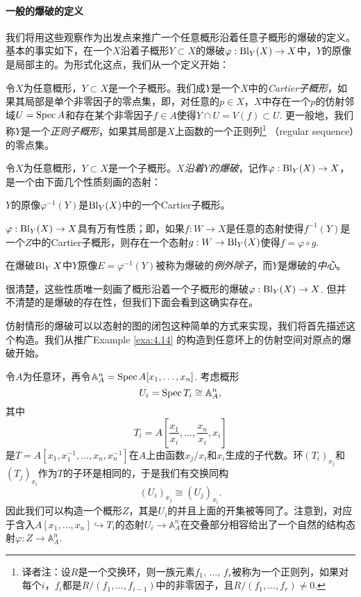 \paragraph*{一般的爆破的定义}
我们将用这些观察作为出发点来推广一个任意概形沿着任意子概形的爆破的定义。基本的事实如下，在一个$X$沿着子概形$Y\subset X$的爆破$\varphi:\operatorname{Bl}_Y(X)\to X$中，$Y$的原像是局部主的。为形式化这点，我们从一个定义开始：


\begin{defi}\label{defi:4.15}
	令$X$为任意概形，$Y\subset X$是一个子概形。我们成$Y$是一个$X$中的\textit{Cartier子概形}，如果其局部是单个非零因子的零点集，即，对任意的$p\in X$，$X$中存在一个$p$的仿射邻域$U=\operatorname{Spec} A$和存在某个非零因子$f\in A$使得$Y\cap U=V(f)\subset U$. 更一般地，我们称$Y$是一个\textit{正则子概形}，如果其局部是$X$上函数的一个正则列\footnote{
		译者注：设$R$是一个交换环，则一族元素$f_1$, $\dots$, $f_r$被称为一个正则列，如果对每个$i$，$f_i$都是$R/(f_1,\dots,f_{i-1})$中的非零因子，且$R/(f_1,\dots,f_{r})\neq 0$.
	}%
	（regular sequence）的零点集。
\end{defi}

\begin{defi}\label{defi:4.16}
	令$X$为任意概形，$Y\subset X$是一个子概形。\textit{$X$沿着$Y$的爆破}，记作$\varphi:\operatorname{Bl}_Y(X)\to X$，是一个由下面几个性质刻画的态射：
	\begin{compactenum}[(1)]
		\item $Y$的原像$\varphi^{-1}(Y)$是$\operatorname{Bl}_Y(X)$中的一个Cartier子概形。
		\item $\varphi:\operatorname{Bl}_Y(X)\to X$具有万有性质；即，如果$f:W\to X$是任意的态射使得$f^{-1}(Y)$是一个$Z$中的Cartier子概形，则存在一个态射$g:W\to \operatorname{Bl}_Y(X)$使得$f=\varphi\circ g$.
	\end{compactenum}
	在爆破$\operatorname{Bl}_YX$中$Y$原像$E=\varphi^{-1}(Y)$被称为爆破的\textit{例外除子}，而$Y$是爆破的\textit{中心}。
\end{defi}

很清楚，这些性质唯一刻画了概形沿着一个子概形的爆破$\varphi:\operatorname{Bl}_Y(X)\to X$. 但并不清楚的是爆破的存在性，但我们下面会看到这确实存在。

仿射情形的爆破可以以态射的图的闭包这种简单的方式来实现，我们将首先描述这个构造。我们从推广Example \ref{exa:4.14} 的构造到任意环上的仿射空间对原点的爆破开始。

\begin{exa}\label{exa:4.17}
	令$A$为任意环，再令$\mathbb A_A^n=\operatorname{Spec} A[x_1,\dots,x_n]$. 考虑概形
	\[
	U_i=\operatorname{Spec} T_i\cong \mathbb A_A^n,
	\]
	其中
	\[
		T_i=A\left[\frac{x_1}{x_i},\dots,\frac{x_n}{x_i},x_i\right]
	\]
	是$T=A[x_1,x_1^{-1},\dots,x_n,x_n^{-1}]$在$A$上由函数$x_j/x_i$和$x_i$生成的子代数。环$(T_{i})_{x_j}$和$(T_j)_{x_i}$作为$T$的子环是相同的，于是我们有交换同构
	\[
		(U_i)_{x_j}\cong (U_j)_{x_i}.
	\]
	因此我们可以构造一个概形$Z$，其是$U_i$的并且上面的开集被等同了。注意到，对应于含入$A[x_1,\dots,x_n]\hookrightarrow T_i$的态射$U_i\to \mathbb A_A^n$在交叠部分相容给出了一个自然的结构态射$\varphi:Z\to \mathbb A_A^n$.
\end{exa}

